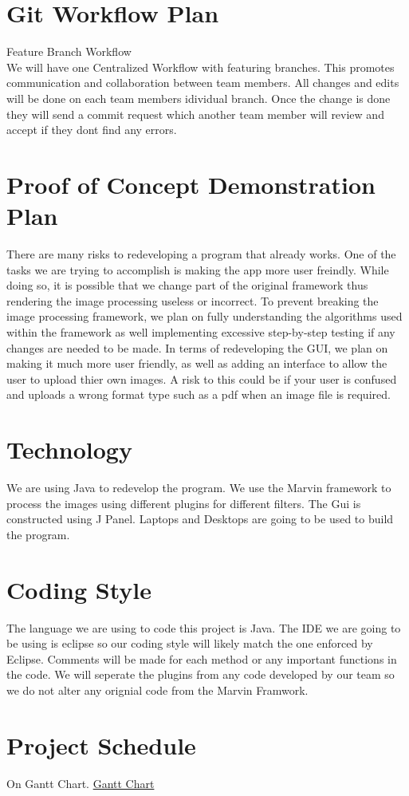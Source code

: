 \documentclass{article}
\begin{document}
\section{Git Workflow Plan}
Feature Branch Workflow\\
We will have one Centralized Workflow with featuring branches. This promotes communication and collaboration between team members. All changes and edits will be done on each team members idividual branch. Once the change is done they will send a commit request which another team member will review and accept if they dont find any errors.

\section{Proof of Concept Demonstration Plan}
There are many risks to redeveloping a program that already works. One of the tasks we are trying to accomplish is making the app more user freindly. While doing so, it is possible that we change part of the original framework thus rendering the image processing useless or incorrect. To prevent breaking the image processing framework, we plan on fully understanding the algorithms used within the framework as well implementing excessive step-by-step testing if any changes are needed to be made. In terms of redeveloping the GUI, we plan on making it much more user friendly, as well as adding an interface to allow the user to upload thier own images. A risk to this could be if your user is confused and uploads a wrong format type such as a pdf when an image file is required.

\section{Technology}
We are using Java to redevelop the program. We use the Marvin framework to process the images using different plugins for different filters. The Gui is constructed using J Panel. Laptops and Desktops are going to be used to build the program.

\section{Coding Style}
The language we are using to code this project is Java. The IDE we are going to be using is eclipse so our coding style will likely match the one enforced by Eclipse. Comments will be made for each method or any important functions in the code. We will seperate the plugins from any code developed by our team so we do not alter any orignial code from the Marvin Framwork.

\section{Project Schedule}
On Gantt Chart.
\href{https://gitlab.cas.mcmaster.ca/dimitn/image_processing_app/blob/master/ProjectSchedule/3XA3Gantt.pdf}{Gantt Chart}
\end{document}
